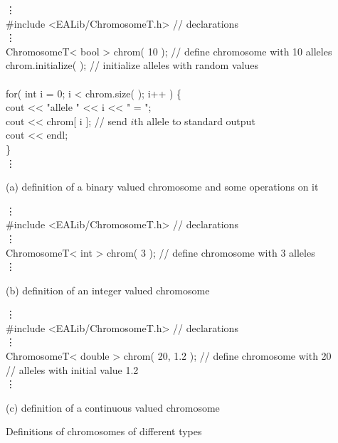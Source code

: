 \begin{example}[hb]
\begin{shortlisting}
            \vdots\\
\#include <EALib/ChromosomeT.h>         // {\rm declarations}\\
            \vdots\\
ChromosomeT< bool > chrom( 10 ); // {\rm define chromosome with 10 alleles\hspace*{-10cm}}\\
chrom.initialize( );             // {\rm initialize alleles with random values}\hspace*{-10cm}\\
\\
for( int i = 0; i < chrom.size( ); i++ ) \{\\
    cout << "allele " << i << " = ";\\
    cout << chrom[ i ];          // {\rm send $i$th allele to standard output\hspace*{-10cm}}\\
    cout << endl;\\
\}\\
            \vdots\\
\end{shortlisting}

(a) definition of a binary valued chromosome and some operations on it

\begin{shortlisting}
            \vdots\\
\#include <EALib/ChromosomeT.h>         // {\rm declarations}\\
            \vdots\\
ChromosomeT< int > chrom( 3 );   // {\rm define chromosome with 3 alleles\hspace*{-10cm}}\\
            \vdots\\
\end{shortlisting}

(b) definition of an integer valued chromosome

\begin{shortlisting}
            \vdots\\
\#include <EALib/ChromosomeT.h>        // {\rm declarations}\\
            \vdots\\
ChromosomeT< double > chrom( 20, 1.2 );  // {\rm define chromosome with 20\hspace*{-10cm}}\\
                                         // {\rm alleles with initial value 1.2\hspace*{-10cm}}\\
            \vdots\\
\end{shortlisting}

(c) definition of a continuous valued chromosome

\caption[Definitions of Chromosomes of Different Types]{
\label{datastruct:example:chrom-def}
Definitions of chromosomes of different types
}
\end{example}




